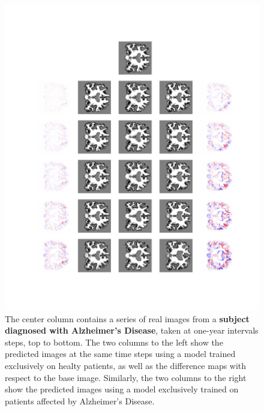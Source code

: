 \begin{figure}
	\centering
	\includegraphics[width=\linewidth, trim={100 100 66 30}, clip]{images/HC_AD_plots/comp_ADNI_141445}
	\vspace*{-15pt}
	\caption{The center column contains a series of real images from a \textbf{subject diagnosed with Alzheimer's Disease}, taken at one-year intervals steps, top to bottom. The two columns to the left show the predicted images at the same time steps using a model trained exclusively on healty patients, as well as the difference maps with respect to the base image. Similarly, the two columns to the right show the predicted images using a model exclusively trained on patients affected by Alzheimer's Disease.}
	\label{fig:hcad_ad}
\end{figure}

